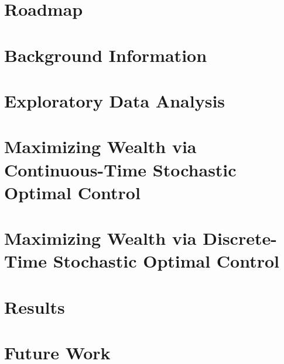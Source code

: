 \documentclass{beamer}
\begin{document}
    \maketitle
    \section*{Roadmap}
    \frame{\tableofcontents}

    \section{Background Information}
    
    
    \section{Exploratory Data Analysis}
    
    
    \section{Maximizing Wealth via Continuous-Time Stochastic Optimal Control}
    
    
    \section{Maximizing Wealth via Discrete-Time Stochastic Optimal Control}
    

    \section{Results}
    
    
    \section{Future Work}
    
    
\end{document}
